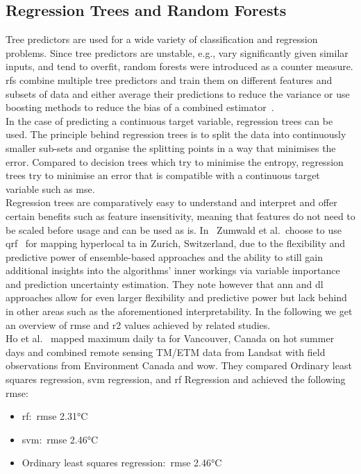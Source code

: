 \subsection{Regression Trees and Random Forests}

Tree predictors are used for a wide variety of classification and regression problems. Since tree predictors are unstable, e.g., vary significantly given similar inputs, and tend to overfit, random forests were introduced as a counter measure. \gls{rf}s combine multiple tree predictors and train them on different features and subsets of data and either average their predictions to reduce the variance or use boosting methods to reduce the bias of a combined estimator~\cite{breiman2001random}.\\
In the case of predicting a continuous target variable, regression trees can be used. The principle behind regression trees is to split the data into continuously smaller sub-sets and organise the splitting points in a way that minimises the error. Compared to decision trees which try to minimise the entropy, regression trees try to minimise an error that is compatible with a continuous target variable such as \gls{mse}.\\
Regression trees are comparatively easy to understand and interpret and offer certain benefits such as feature insensitivity, meaning that features do not need to be scaled before usage and can be used as is. In~\cite{zumwald2021mapping} Zumwald et al.\ choose to use \gls{qrf}~\cite{meinshausen2006quantile} for mapping hyperlocal \gls{ta} in Zurich, Switzerland, due to the flexibility and predictive power of ensemble-based approaches and the ability to still gain additional insights into the algorithms' inner workings via variable importance and prediction uncertainty estimation. They note however that \gls{ann} and \gls{dl} approaches allow for even larger flexibility and predictive power but lack behind in other areas such as the aforementioned interpretability. In the following we get an overview of \gls{rmse} and \gls{r2} values achieved by related studies.\\
Ho et al.~\cite{ho2014mapping} mapped maximum daily \gls{ta} for Vancouver, Canada on hot summer days and combined remote sensing TM/ETM data from Landsat with field observations from Environment Canada and \gls{wow}. They compared Ordinary least squares regression, \gls{svm} regression, and \gls{rf} Regression and achieved the following \gls{rmse}:

\begin{itemize}
    \item \gls{rf}:\ \gls{rmse} 2.31°C
    \item \gls{svm}:\ \gls{rmse} 2.46°C
    \item Ordinary least squares regression:\ \gls{rmse} 2.46°C
\end{itemize}

